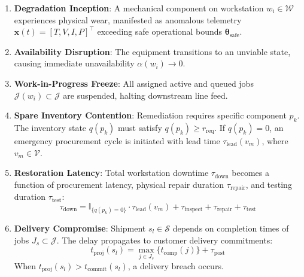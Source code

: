 \documentclass[10pt,twocolumn,a4paper]{article}
\begin{document}
\begin{enumerate}
    \item \textbf{Degradation Inception}: A mechanical component on workstation $w_i \in \mathcal{W}$ experiences physical wear, manifested as anomalous telemetry $\mathbf{x}(t) = [T, V, I, P]^\top$ exceeding safe operational bounds $\mathbf{\theta}_{\text{safe}}$.
    \item \textbf{Availability Disruption}: The equipment transitions to an unviable state, causing immediate unavailability $\alpha(w_i) \to 0$.
    \item \textbf{Work-in-Progress Freeze}: All assigned active and queued jobs $\mathcal{J}(w_i) \subset \mathcal{J}$ are suspended, halting downstream line feed.
    \item \textbf{Spare Inventory Contention}: Remediation requires specific component $p_k$. The inventory state $q(p_k)$ must satisfy $q(p_k) \ge r_{\text{req}}$. If $q(p_k) = 0$, an emergency procurement cycle is initiated with lead time $\tau_{\text{lead}}(v_m)$, where $v_m \in \mathcal{V}$.
    \item \textbf{Restoration Latency}: Total workstation downtime $\tau_{\text{down}}$ becomes a function of procurement latency, physical repair duration $\tau_{\text{repair}}$, and testing duration $\tau_{\text{test}}$:
    \begin{equation}
        \tau_{\text{down}} = \mathbb{I}_{\{q(p_k) = 0\}} \cdot \tau_{\text{lead}}(v_m) + \tau_{\text{inspect}} + \tau_{\text{repair}} + \tau_{\text{test}}
    \end{equation}
    \item \textbf{Delivery Compromise}: Shipment $s_l \in \mathcal{S}$ depends on completion times of jobs $J_s \subset \mathcal{J}$. The delay propagates to customer delivery commitments:
    \begin{equation}
        t_{\text{proj}}(s_l) = \max_{j \in J_s} \{ t_{\text{comp}}(j) \} + \tau_{\text{post}}
    \end{equation}
    When $t_{\text{proj}}(s_l) > t_{\text{commit}}(s_l)$, a delivery breach occurs.
\end{enumerate}
\end{document}
